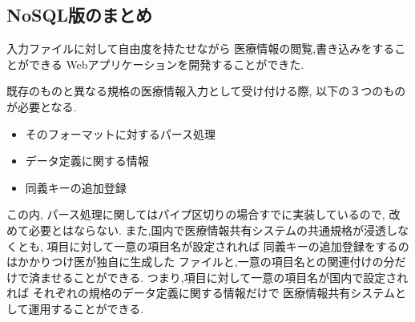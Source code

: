 \subsection{NoSQL版のまとめ}
	入力ファイルに対して自由度を持たせながら
	医療情報の閲覧,書き込みをすることができる
	Webアプリケーションを開発することができた.

	既存のものと異なる規格の医療情報入力として受け付ける際,
	以下の３つのものが必要となる.

	\begin{itemize}
		\item そのフォーマットに対するパース処理
		\item データ定義に関する情報
		\item  同義キーの追加登録
	\end{itemize}

	この内, パース処理に関してはパイプ区切りの場合すでに実装しているので,
	改めて必要とはならない.
	また,国内で医療情報共有システムの共通規格が浸透しなくとも,
	項目に対して一意の項目名が設定されれば
	同義キーの追加登録をするのはかかりつけ医が独自に生成した
	ファイルと,一意の項目名との関連付けの分だけで済ませることができる.
	つまり,項目に対して一意の項目名が国内で設定されれば
	それぞれの規格のデータ定義に関する情報だけで
	医療情報共有システムとして運用することができる.

